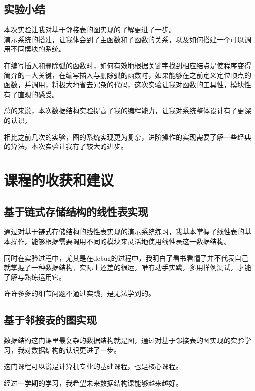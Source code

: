 \documentclass[supercite]{Experimental_Report}
\theoremstyle{definition}
\begin{document}
\subsection{实验小结}
本次实验让我对基于邻接表的图实现的了解更进了一步。\\
演示系统的搭建，让我体会到了主函数和子函数的关系，以及如何搭建一个可以调用不同模块的系统。\par
在编写插入和删除弧的函数时，如何有效地根据关键字找到相应结点是使程序变得简介的一大关键，在编写插入与删除弧的函数时，如果能够在之前定义定位顶点的函数，并调用，将极大地省去冗杂的代码，这次实验让我对函数的工具性，模块性有了直观的感受。\par
总的来说，本次数据结构实验提高了我的编程能力，让我对系统整体设计有了更深的认识。\par
相比之前几次的实验，图的系统实现更为复杂，进阶操作的实现需要了解一些经典的算法，本次实验让我有了较大的进步。
\clearpage
\section{课程的收获和建议}
\subsection{基于链式存储结构的线性表实现}
通过对基于链式存储结构的线性表实现的演示系统练习，我基本掌握了线性表的基本操作，能够根据需要调用不同的模块来灵活地使用线性表这一数据结构。\par
同时在实验过程中，尤其是在debug的过程中，我明白了看书看懂了并不代表自己就掌握了一种数据结构，实际上还差的很远，唯有动手实践，多用样例测试，才能了解与熟练运用它。\par
许许多多的细节问题不通过实践，是无法学到的。
\subsection{基于邻接表的图实现}
数据结构这门课里最复杂的数据结构就是图，通过对基于邻接表的图实现的实验学习，我对数据结构的认识更进了一步。\par
这门课程可以说是计算机专业的基础课程，也是核心课程。\par
经过一学期的学习，我希望未来数据结构课能够越来越好。\par
\nocite{*} %



\setcounter{secnumdepth}{0}
\appendix
\end{document}

